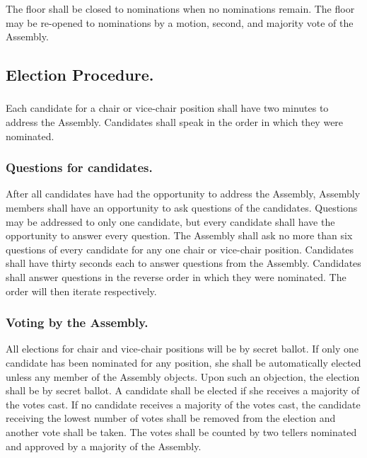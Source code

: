 \documentclass{rules}
\begin{document}
\subsubsection{}
The floor shall be closed to nominations when no nominations remain.  The floor may be re-opened to nominations by a motion, second, and majority vote of the Assembly.
\subsection{Election Procedure.}
\subsubsection{}
Each candidate for a chair or vice-chair position shall have two minutes to address the Assembly.  Candidates shall speak in the order in which they were nominated.
\subsubsection{Questions for candidates.}
\subsubsubsection{}
After all candidates have had the opportunity to address the Assembly, Assembly members shall have an opportunity to ask questions of the candidates.
\subsubsubsection{}
Questions may be addressed to only one candidate, but every candidate shall have the opportunity to answer every question.
\subsubsubsection{}
The Assembly shall ask no more than six questions of every candidate for any one chair or vice-chair position.
\subsubsubsection{}
Candidates shall have thirty seconds each to answer questions from the Assembly.
\subsubsubsection{}
Candidates shall answer questions in the reverse order in which they were nominated.  The order will then iterate respectively.
\subsubsection{Voting by the Assembly.}
\subsubsubsection{}
All elections for chair and vice-chair positions will be by secret ballot.  
\subsubsubsection{}
If only one candidate has been nominated for any position, she shall be automatically elected unless any member of the Assembly objects.  Upon such an objection, the election shall be by secret ballot.
\subsubsubsection{}
A candidate shall be elected if she receives a majority of the votes cast.
\subsubsubsection{}
If no candidate receives a majority of the votes cast, the candidate receiving the lowest number of votes shall be removed from the election and another vote shall be taken.
\subsubsubsection{}
The votes shall be counted by two tellers nominated and approved by a majority of the Assembly.
\end{document}
